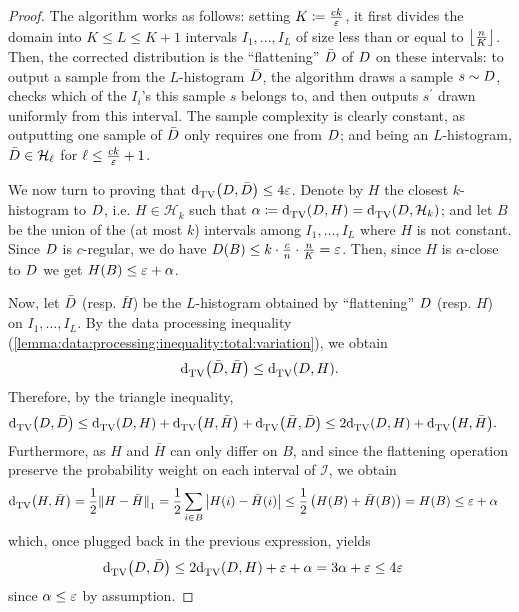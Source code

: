\begin{proof}
  The algorithm works as follows: setting $K\coloneqq \frac{ck}{\varepsilon}$, it first divides the domain into $K\leq L\leq K+1$ intervals $I_1,\dots,I_{L}$ of size less than or equal to $\left\lfloor \frac{n}{K} \right\rfloor$. Then, the corrected distribution is the ``flattening'' $\bar{D}$ of $D$ on these intervals: to output a sample from the $L$-histogram $\bar{D}$, the algorithm draws a sample $s\sim D$, checks which of the $I_i$'s this sample $s$ belongs to, and then outputs $s^\prime$ drawn uniformly from this interval. The sample complexity is clearly constant, as outputting one sample of $\bar{D}$ only requires one from $D$; and being an $L$-histogram, $\bar{D}\in\mathcal{H}_{\ell}$ for $\ell \leq \frac{ck}{\varepsilon}+1$.
  
We now turn to proving that ${\operatorname{d}_{\textrm{TV}}^{}\!\left({D, \bar{D}}\right)} \leq 4\varepsilon$. Denote by $H$ the closest $k$-histogram to $D$, i.e. $H\in\mathcal{H}_k$ such that $\alpha\coloneqq{\operatorname{d}_{\textrm{TV}}^{}\!\left({\ensuremath{D}, H}\right)}={\operatorname{d}_{\textrm{TV}}^{}\!\left({D, \mathcal{H}_k}\right)}$; and let $B$ be the union of the (at most $k$) intervals among $I_1,\dots,I_{L}$ where $H$ is not constant. Since $D$ is $c$-regular, we do have $D(B) \leq k\cdot\frac{c}{n}\cdot\frac{n}{K} = \varepsilon$. Then, since $H$ is $\alpha$-close to $D$ we get $H(B) \leq \varepsilon+\alpha$.

Now, let $\bar{D}$ (resp. $\bar{H}$) be the $L$-histogram obtained by ``flattening'' $D$ (resp. $H$) on $I_1,\dots,I_{L}$. By the data processing inequality (\autoref{lemma:data:processing:inequality:total:variation}), we obtain
\[
    {\operatorname{d}_{\textrm{TV}}^{}\!\left({\bar{D}, \bar{H}}\right)} \leq {\operatorname{d}_{\textrm{TV}}^{}\!\left({\ensuremath{D}, H}\right)}.
\]
Therefore, by the triangle inequality,
\begin{align*}
    {\operatorname{d}_{\textrm{TV}}^{}\!\left({\ensuremath{D}, \bar{\ensuremath{D}}}\right)} &\leq {\operatorname{d}_{\textrm{TV}}^{}\!\left({\ensuremath{D}, H}\right)} + {\operatorname{d}_{\textrm{TV}}^{}\!\left({H, \bar{H}}\right)} + {\operatorname{d}_{\textrm{TV}}^{}\!\left({\bar{H}, \bar{D}}\right)} 
    \leq 2{\operatorname{d}_{\textrm{TV}}^{}\!\left({D, H}\right)} + {\operatorname{d}_{\textrm{TV}}^{}\!\left({H, \bar{H}}\right)}.
\end{align*}
Furthermore, as $H$ and $\bar{H}$ can only differ on $B$, and since the flattening operation preserve the probability weight on each interval of $\mathcal{I}$, we obtain
\begin{align*}
  {\operatorname{d}_{\textrm{TV}}^{}\!\left({H, \bar{H}}\right)} &= \frac{1}{2}{\lVert H-\bar{H} {\rVert}}_1 = \frac{1}{2}\sum_{i\in B} \left\lvert  H(i) - \bar{H}(i)  \right\rvert 
  \leq \frac{1}{2}\left(H(B) + \bar{H}(B)\right) =H(B) \leq \varepsilon+\alpha
\end{align*}
which, once plugged back in the previous expression, yields
\begin{align*}
    {\operatorname{d}_{\textrm{TV}}^{}\!\left({\ensuremath{D}, \bar{\ensuremath{D}}}\right)} &\leq 2{\operatorname{d}_{\textrm{TV}}^{}\!\left({D, H}\right)} + \varepsilon+\alpha = 3\alpha + \varepsilon 
    \leq 4\varepsilon
\end{align*}
since $\alpha \leq \varepsilon$ by assumption.
\end{proof}
